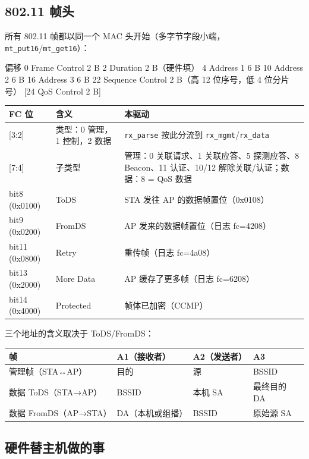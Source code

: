 \documentclass[UTF8,zihao=-4,fontset=none]{ctexart}
\newcommand{\fn}[1]{\texttt{#1}}
\begin{document}
\subsection{802.11 帧头}

所有 802.11 帧都以同一个 MAC 头开始（多字节字段小端，\fn{mt\_put16}/\fn{mt\_get16}）：

\begin{code}
偏移  0  Frame Control 2 B     2  Duration 2 B（硬件填）
      4  Address 1  6 B        10 Address 2  6 B       16 Address 3  6 B
     22  Sequence Control 2 B（高 12 位序号，低 4 位分片号）  [24  QoS Control 2 B]
\end{code}

\begin{longtable}{p{22mm}p{40mm}p{86mm}}
\toprule
FC 位 & 含义 & 本驱动 \\ \midrule \endhead
{[3:2]} & 类型：0 管理，1 控制，2 数据 & \fn{rx\_parse} 按此分流到 \fn{rx\_mgmt}/\fn{rx\_data} \\
{[7:4]} & 子类型 & 管理：0 关联请求、1 关联应答、5 探测应答、8 Beacon、11 认证、10/12 解除关联/认证；数据：8 = QoS 数据 \\
bit8 (0x0100) & ToDS & STA 发往 AP 的数据帧置位（0x0108） \\
bit9 (0x0200) & FromDS & AP 发来的数据帧置位（日志 fc=4208） \\
bit11 (0x0800) & Retry & 重传帧（日志 fc=4a08） \\
bit13 (0x2000) & More Data & AP 缓存了更多帧（日志 fc=6208） \\
bit14 (0x4000) & Protected & 帧体已加密（CCMP） \\
\bottomrule
\end{longtable}

三个地址的含义取决于 ToDS/FromDS：

\begin{table}[H]\centering\small
\begin{tabular}{llll}
\toprule
帧 & A1（接收者） & A2（发送者） & A3 \\ \midrule
管理帧（STA↔AP） & 目的 & 源 & BSSID \\
数据 ToDS（STA→AP） & BSSID & 本机 SA & 最终目的 DA \\
数据 FromDS（AP→STA） & DA（本机或组播） & BSSID & 原始源 SA \\
\bottomrule
\end{tabular}
\end{table}

\subsection{硬件替主机做的事}
\end{document}
